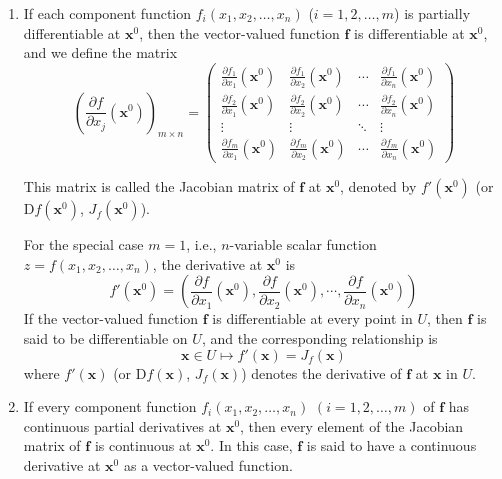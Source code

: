 \documentclass[11pt]{elegantbook}
\begin{document}
\begin{enumerate}
    \item  If each component function $f_i(x_1, x_2, \dots, x_n)$ ($i=1,2,\dots,m$) is partially differentiable at $\mathbf{x}^0$, 
        then the vector-valued function $\mathbf{f}$ is differentiable at $\mathbf{x}^0$, and we define the matrix
        \[
            \left( \frac{\partial f}{\partial x_j} (\mathbf{x}^0) \right)_{m \times n}
            =
            \begin{pmatrix}
            \frac{\partial f_1}{\partial x_1}(\mathbf{x}^0) & \frac{\partial f_1}{\partial x_2}(\mathbf{x}^0) & \cdots & \frac{\partial f_1}{\partial x_n}(\mathbf{x}^0) \\
            \frac{\partial f_2}{\partial x_1}(\mathbf{x}^0) & \frac{\partial f_2}{\partial x_2}(\mathbf{x}^0) & \cdots & \frac{\partial f_2}{\partial x_n}(\mathbf{x}^0) \\
            \vdots & \vdots & \ddots & \vdots \\
            \frac{\partial f_m}{\partial x_1}(\mathbf{x}^0) & \frac{\partial f_m}{\partial x_2}(\mathbf{x}^0) & \cdots & \frac{\partial f_m}{\partial x_n}(\mathbf{x}^0)
            \end{pmatrix}
        \]

        This matrix is called the Jacobian matrix of $\mathbf{f}$ at $\mathbf{x}^0$, 
        denoted by $f'(\mathbf{x}^0)$ (or $\mathrm{D}f(\mathbf{x}^0)$, $J_f(\mathbf{x}^0)$).

        For the special case $m=1$, i.e., $n$-variable scalar function $z=f(x_1,x_2,\dots,x_n)$, 
        the derivative at $\mathbf{x}^0$ is
        \[
            f'(\mathbf{x}^0) = 
            \left( 
                \frac{\partial f}{\partial x_1}(\mathbf{x}^0), \frac{\partial f}{\partial x_2}(\mathbf{x}^0), 
                \cdots, \frac{\partial f}{\partial x_n}(\mathbf{x}^0) 
            \right)
        \]
        If the vector-valued function $\mathbf{f}$ is differentiable at every point in $U$, 
        then $\mathbf{f}$ is said to be differentiable on $U$, and the corresponding relationship is
        \[
        \mathbf{x} \in U \mapsto f'(\mathbf{x}) = J_f(\mathbf{x})
        \]
        where $f'(\mathbf{x})$ (or $\mathrm{D}f(\mathbf{x})$, $J_f(\mathbf{x})$) 
        denotes the derivative of $\mathbf{f}$ at $\mathbf{x}$ in $U$.
    \item  If every component function $f_i(x_1, x_2, \dots, x_n)$ $(i=1,2,\dots,m)$ of $\mathbf{f}$ 
        has continuous partial derivatives at $\mathbf{x}^0$, 
        then every element of the Jacobian matrix of $\mathbf{f}$ is continuous at $\mathbf{x}^0$. 
        In this case, $\mathbf{f}$ is said to have a continuous derivative at $\mathbf{x}^0$ as a vector-valued function.
        

\end{enumerate}
\end{document}
